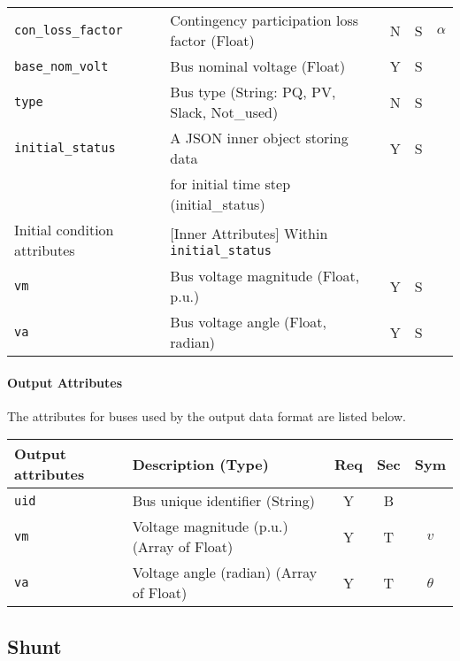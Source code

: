 \documentclass{article}
\begin{document}
\begin{center}
\begin{tabular}{ l | l | c | c | c |}
  \hline
  {\tt con\_loss\_factor} & Contingency participation loss factor (Float) & N & S & $\alpha$\\
  {\tt base\_nom\_volt} & Bus nominal voltage (Float) & {\color{red} Y} & S & \\
  {\tt type} & Bus type (String: PQ, PV, Slack, Not\_used) & N & S &\\
  {\tt initial\_status} & A JSON inner object storing data  & Y & S &  \\
       & for initial time step (initial\_status) &  &  &  \\
  \hline
  Initial condition attributes & [Inner Attributes] Within {\tt initial\_status} & & & \\
  \hline
  {\tt vm}   & Bus voltage magnitude (Float, p.u.) & Y & S & \\
  {\tt va}   & Bus voltage angle     (Float, radian) & Y & S & \\
  \hline
\end{tabular}
\end{center}\textbf{}
\paragraph{Output Attributes} The attributes for buses used by the output data format are listed below.

\begin{center}
\small
\begin{tabular}{ l | l | c | c | c |}
Output attributes & Description (Type) & Req & Sec & Sym\\
\hline
  {\tt uid} & Bus unique identifier (String) & Y & B & \\
  
  {\tt vm} & Voltage magnitude (p.u.) (Array of Float)  & Y & T & $v$ \\
  {\tt va} & Voltage angle (radian) (Array of Float)  & Y & T & $\theta$\\
\hline
\end{tabular}
\end{center}



\subsection{Shunt}
\label{nom:shunt}
\end{document}
